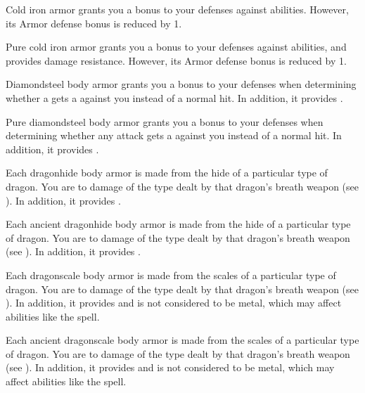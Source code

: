        Cold iron armor grants you a  bonus to your defenses against \magical abilities.
      However, its Armor defense bonus is reduced by 1.

       Pure cold iron armor grants you a  bonus to your defenses against \magical abilities, and provides  damage resistance.
      However, its Armor defense bonus is reduced by 1.

       Diamondsteel body armor grants you a  bonus to your defenses when determining whether a  gets a  against you instead of a normal hit.
      In addition, it provides  .

       Pure diamondsteel body armor grants you a  bonus to your defenses when determining whether any attack gets a  against you instead of a normal hit.
      In addition, it provides  .

       Each dragonhide body armor is made from the hide of a particular type of dragon.
      You are  to damage of the type dealt by that dragon's breath weapon (see ).
      In addition, it provides  .

       Each ancient dragonhide body armor is made from the hide of a particular type of dragon.
      You are  to damage of the type dealt by that dragon's breath weapon (see ).
      In addition, it provides  .

       Each dragonscale body armor is made from the scales of a particular type of dragon.
      You are  to damage of the type dealt by that dragon's breath weapon (see ).
      In addition, it provides   and is not considered to be metal, which may affect abilities like the  spell.

       Each ancient dragonscale body armor is made from the scales of a particular type of dragon.
      You are  to damage of the type dealt by that dragon's breath weapon (see ).
      In addition, it provides   and is not considered to be metal, which may affect abilities like the  spell.

